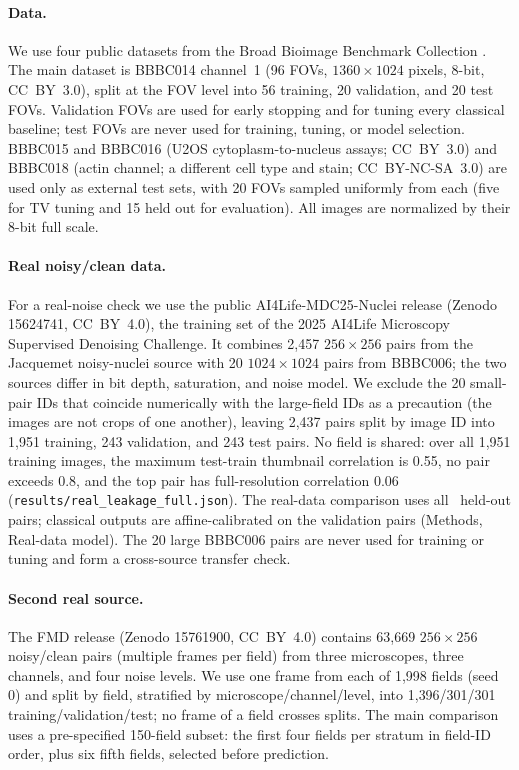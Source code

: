 \documentclass[10pt]{article}
\begin{document}
\paragraph{Data.}
We use four public datasets from the Broad Bioimage Benchmark Collection
\cite{ljosa2012bbbc}. The main dataset is BBBC014 channel~1 (96 FOVs,
$1360\times1024$ pixels, 8-bit, CC~BY~3.0), split at the FOV level into 56
training, 20 validation, and 20 test FOVs. Validation FOVs are used for early
stopping and for tuning every classical baseline; test FOVs are never used for
training, tuning, or model selection. BBBC015 and BBBC016 (U2OS
cytoplasm-to-nucleus assays; CC~BY~3.0) and BBBC018 (actin channel; a different
cell type and stain; CC~BY-NC-SA~3.0) are used only as external test sets, with
20 FOVs sampled uniformly from each (five for TV tuning and 15 held out for evaluation). All images are normalized by their 8-bit full scale.

\paragraph{Real noisy/clean data.}
For a real-noise check we use the public AI4Life-MDC25-Nuclei release
\cite{ai4life_mdc25_2025} (Zenodo 15624741, CC~BY~4.0), the training set of the
2025 AI4Life Microscopy Supervised Denoising Challenge. It combines 2{,}457
$256\times256$ pairs from the Jacquemet noisy-nuclei source with 20
$1024\times1024$ pairs from BBBC006; the two sources differ in bit depth,
saturation, and noise model. We exclude the 20 small-pair IDs that coincide
numerically with the large-field IDs as a precaution (the images are not crops
of one another), leaving 2{,}437 pairs split by image ID into 1{,}951 training,
243 validation, and 243 test pairs. No field is shared: over all 1{,}951
training images, the maximum test-train thumbnail correlation is 0.55, no pair
exceeds 0.8, and the top pair has full-resolution correlation 0.06
(\texttt{results/real\_leakage\_full.json}). The
real-data comparison uses all \RealN\ held-out pairs; classical outputs are
affine-calibrated on the validation pairs (Methods, Real-data model). The 20
large BBBC006 pairs are never used for training
or tuning and form a cross-source transfer check.

\paragraph{Second real source.}
The FMD release \cite{zhang2019fmd,ai4life_mdc25_fmd_2025} (Zenodo 15761900, CC~BY~4.0)
contains 63{,}669 $256\times256$ noisy/clean pairs (multiple frames per field)
from three microscopes, three channels, and four noise levels. We use one frame
from each of 1{,}998 fields (seed 0) and split by field, stratified by
microscope/channel/level, into 1{,}396/301/301
training/validation/test; no frame of a field crosses splits. The main
comparison uses a pre-specified 150-field subset: the first four fields per
stratum in field-ID order, plus six fifth fields, selected before prediction.
\end{document}
